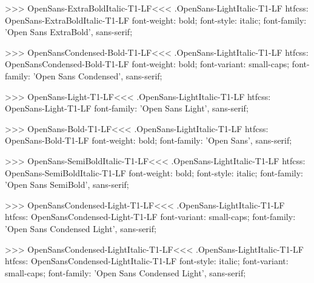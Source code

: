 >>>
\<OpenSans-ExtraBoldItalic-T1-LF\><<<
.OpenSans-LightItalic-T1-LF
htfcss:  OpenSans-ExtraBoldItalic-T1-LF  font-weight: bold; font-style: italic; font-family: 'Open Sans ExtraBold', sans-serif;

>>>
\<OpenSansCondensed-Bold-T1-LF\><<<
.OpenSans-LightItalic-T1-LF
htfcss:  OpenSansCondensed-Bold-T1-LF  font-weight: bold; font-variant: small-caps; font-family: 'Open Sans Condensed', sans-serif;

>>>
\<OpenSans-Light-T1-LF\><<<
.OpenSans-LightItalic-T1-LF
htfcss:  OpenSans-Light-T1-LF  font-family: 'Open Sans Light', sans-serif;

>>>
\<OpenSans-Bold-T1-LF\><<<
.OpenSans-LightItalic-T1-LF
htfcss:  OpenSans-Bold-T1-LF  font-weight: bold; font-family: 'Open Sans', sans-serif;

>>>
\<OpenSans-SemiBoldItalic-T1-LF\><<<
.OpenSans-LightItalic-T1-LF
htfcss:  OpenSans-SemiBoldItalic-T1-LF  font-weight: bold; font-style: italic; font-family: 'Open Sans SemiBold', sans-serif;

>>>
\<OpenSansCondensed-Light-T1-LF\><<<
.OpenSans-LightItalic-T1-LF
htfcss:  OpenSansCondensed-Light-T1-LF  font-variant: small-caps; font-family: 'Open Sans Condensed Light', sans-serif;

>>>
\<OpenSansCondensed-LightItalic-T1-LF\><<<
.OpenSans-LightItalic-T1-LF
htfcss:  OpenSansCondensed-LightItalic-T1-LF  font-style: italic; font-variant: small-caps; font-family: 'Open Sans Condensed Light', sans-serif;

